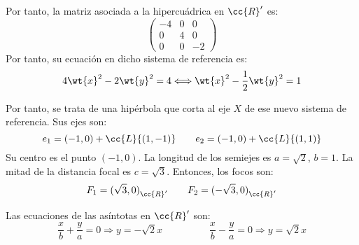 \begin{ejercicio}
\begin{enumerate}
        
        Por tanto, la matriz asociada a la hipercuádrica en $\cc{R}'$ es:
        \begin{equation*}
            \left(\begin{array}{c|cc}
                -4 & 0 & 0  \\ \hline
                0 & 4 & 0 \\
                0 & 0 & -2
            \end{array}\right)
        \end{equation*}
        Por tanto, su ecuación en dicho sistema de referencia es:
        \begin{equation*}
            4\wt{x}^2 -2\wt{y}^2 = 4 \Longleftrightarrow \wt{x}^2 - \frac{1}{2}\wt{y}^2=1
        \end{equation*}
    
        Por tanto, se trata de una hipérbola que corta al eje $X$ de ese nuevo sistema de referencia. Sus ejes son:
        \begin{equation*}
            e_1 = (-1,0) + \cc{L}\{(1,-1)\}
            \qquad
            e_2 = (-1,0) + \cc{L}\{(1,1)\}
        \end{equation*}
        Su centro es el punto $(-1,0)$. La longitud de los semiejes es $a=\sqrt{2}$, $b=1$. La mitad de la distancia focal es $c=\sqrt{3}$. Entonces, los focos son:
        \begin{equation*}
            F_1={(\sqrt{3},0)}_{\cc{R}'}
            \qquad
            F_2={(-\sqrt{3},0)}_{\cc{R}'}
        \end{equation*}
    
        Las ecuaciones de las asíntotas en $\cc{R}'$ son:
        \begin{equation*}
            \frac{x}{b}+\frac{y}{a}=0
            \Longrightarrow y = -{\sqrt{2}}x
            \hspace{2cm}
            \frac{x}{b}-\frac{y}{a}=0
            \Longrightarrow y = {\sqrt{2}}x
        \end{equation*}
    \end{enumerate}
\end{ejercicio}


